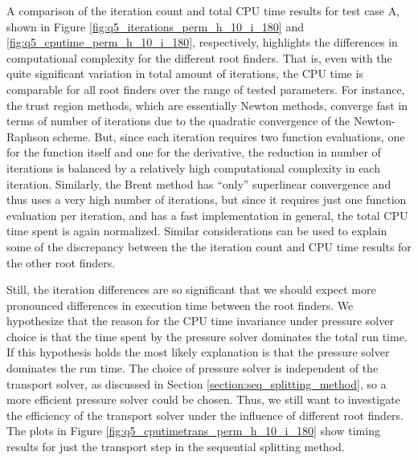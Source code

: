 A comparison of the iteration count and total CPU time results for test case A, shown in Figure \ref{fig:q5_iterations_perm_h_10_i_180} and \ref{fig:q5_cputime_perm_h_10_i_180}, respectively, highlights the differences in computational complexity for the different root finders. That is, even with the quite significant variation in total amount of iterations, the CPU time is comparable for all root finders over the range of tested parameters. For instance, the trust region methods, which are essentially Newton methods, converge fast in terms of number of iterations due to the quadratic convergence of the Newton-Raphson scheme. But, since each iteration requires two function evaluations, one for the function itself and one for the derivative, the reduction in number of iterations is balanced by a relatively high computational complexity in each iteration. Similarly, the Brent method has ``only'' superlinear convergence and thus uses a very high number of iterations, but since it requires just one function evaluation per iteration, and has a fast implementation in general, the total CPU time spent is again normalized. Similar considerations can be used to explain some of the discrepancy between the the iteration count and CPU time results for the other root finders.

Still, the iteration differences are so significant that we should expect more pronounced differences in execution time between the root finders. We hypothesize that the reason for the CPU time invariance under pressure solver choice is that the time spent by the pressure solver dominates the total run time. If this hypothesis holds the most likely explanation is that the pressure solver dominates the run time. The choice of pressure solver is independent of the transport solver, as discussed in Section \ref{section:seq_splitting_method}, so a more efficient pressure solver could be chosen. Thus, we still want to investigate the efficiency of the transport solver under the influence of different root finders. The plots in Figure \ref{fig:q5_cputimetrans_perm_h_10_i_180} show timing results for just the transport step in the sequential splitting method. 




